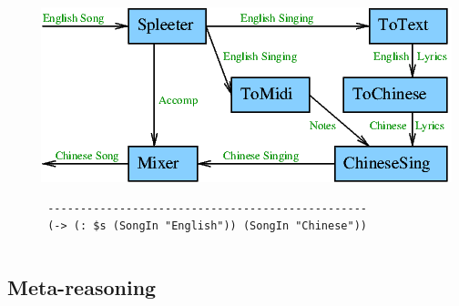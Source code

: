 \documentclass[aspectratio=169]{beamer}
\begin{document}
\begin{frame}[fragile]
\begin{columns}
\begin{column}{7cm}
    \end{column}

    \vrule

    \begin{column}{7cm}

      \includegraphics[scale=0.4]{pics/EnglishToChineseSong.png}

      \begin{lstlisting}
 -------------------------------------------------
 (-> (: $s (SongIn "English")) (SongIn "Chinese"))
      \end{lstlisting}

    \end{column}

  \end{columns}

\end{frame}

\subsection{Meta-reasoning}
\end{document}
